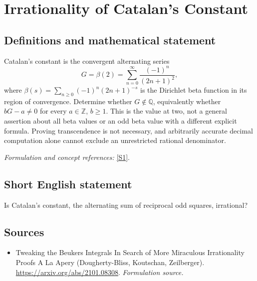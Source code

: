 \documentclass[11pt]{article}
\begin{document}
\section*{\texorpdfstring{Irrationality of Catalan's Constant}{Irrationality of Catalan's Constant}}\label{413}
\subsection{Definitions and mathematical statement}
Catalan's constant is the convergent alternating series
\[
 G=\beta(2)=\sum_{n=0}^{\infty}\frac{(-1)^n}{(2n+1)^2},
\]
where $\beta(s)=\sum_{n\ge0}(-1)^n(2n+1)^{-s}$ is the Dirichlet beta function in its region of convergence. Determine whether $G\notin{\mathbb{Q}}$, equivalently whether $bG-a\ne0$ for every $a\in{\mathbb{Z}}$, $b\ge1$. This is the value at two, not a general assertion about all beta values or an odd beta value with a different explicit formula. Proving transcendence is not necessary, and arbitrarily accurate decimal computation alone cannot exclude an unrestricted rational denominator.
\par\smallskip\textit{Formulation and concept references:} \href{https://arxiv.org/abs/2101.08308}{[S1]}.

\subsection{Short English statement}
Is Catalan's constant, the alternating sum of reciprocal odd squares, irrational?
\subsection{Sources}
\begin{itemize}
\item[S1]Tweaking the Beukers Integrals In Search of More Miraculous Irrationality Proofs A La Apery (Dougherty-Bliss, Koutschan, Zeilberger).
\url{https://arxiv.org/abs/2101.08308}.
\textit{Formulation source.}
\end{itemize}
\end{document}
